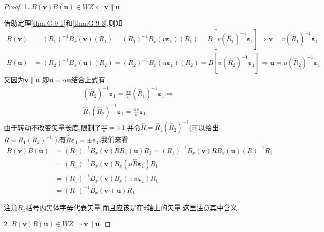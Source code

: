 \documentclass[../main.tex]{subfiles}
\begin{document}
\begin{proof}
	1. $B(\bm{v})B(\bm{u} )\in WZ \Leftarrow \bm{v}  \parallel \bm{u}$

	借助定理\ref{thm:G-9-1}和\ref{thm:G-9-3},则知
	\begin{align*}
		B(\bm{v} ) & = (R_1)^{-1} B_x(\bm{v})(R_1) = (R_1)^{-1} B_x(v \bm{\varepsilon}_1 )(R_1) = B[v(\hat{R}_1)^{-1}\bm{\varepsilon}_1 ] \Rightarrow \bm{v} =  v(\hat{R}_1)^{-1}\bm{\varepsilon}_1 \\
		B(\bm{u} ) & = (R_2)^{-1} B_x(\bm{u})(R_2) = (R_2)^{-1} B_x(u \bm{\varepsilon}_1 )(R_2) = B[u(\hat{R}_2)^{-1}\bm{\varepsilon}_1 ] \Rightarrow \bm{u} =  u(\hat{R}_2)^{-1}\bm{\varepsilon}_1
	\end{align*}
	又因为$\bm{v}\parallel \bm{u} $ 即$\bm{u} = \alpha \bm{u} $结合上式有
	\begin{align*}
		 & (\hat{R}_2)^{-1}\bm{\varepsilon}_1 = \frac{\alpha v}{u} (\hat{R}_1)^{-1}\bm{\varepsilon}_1 \Rightarrow \\
		 & \hat{R}_1 (\hat{R}_2)^{-1} \bm{\varepsilon}_1 = \frac{\alpha v}{u} \bm{\varepsilon}_1
	\end{align*}
	由于转动不改变矢量长度,限制了$\frac{\alpha v}{u} = \pm 1$,并令$\hat{R} = \hat{R}_1 (\hat{R}_2)^{-1}$(可以给出$R = R_1(R_2)^{-1}$
	),有$\hat{R} \bm{\varepsilon}_1 = \pm \bm{\varepsilon}_1 $,我们来看\begin{align*}
		B(\bm{v}) B(\bm{u} ) & =(R_1)^{-1} B_x(\bm{v} ) RB_x(\bm{u} )R_2 = (R_1)^{-1} B_x(\bm{v} ) RB_x(\bm{u} )(R)^{-1}R_1 \\
		                     & = (R_1)^{-1} B_x(\bm{v} ) B_x( u \hat{R}\bm{\varepsilon}_1 )R_1                              \\
		                     & = (R_1)^{-1} B_x(\bm{v} ) B_x(\pm u\bm{\varepsilon}_1 )R_1                                   \\
		                     & = (R_1)^{-1} B_x(\bm{ v} \pm \bm{u} )R_1
	\end{align*}
	\begin{note}
		注意$B_x$括号内黑体字母代表矢量,而且应该是在x轴上的矢量,这里注意其中含义.
	\end{note}
	2. $B(\bm{v})B(\bm{u}) \in WZ \Rightarrow \bm{v}\parallel \bm{u}   $.


\end{proof}
\end{document}
